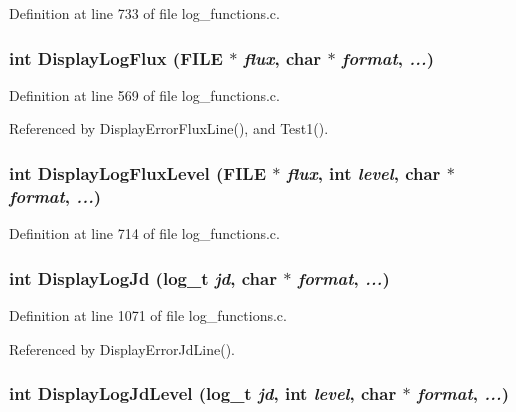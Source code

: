 Definition at line 733 of file log\_\-functions.c.
\subsubsection{\setlength{\rightskip}{0pt plus 5cm}int Display\-Log\-Flux (FILE $\ast$ {\em flux}, char $\ast$ {\em format},  {\em ...})}\label{log__functions_8c_a70}




Definition at line 569 of file log\_\-functions.c.

Referenced by Display\-Error\-Flux\-Line(), and Test1().
\subsubsection{\setlength{\rightskip}{0pt plus 5cm}int Display\-Log\-Flux\-Level (FILE $\ast$ {\em flux}, int {\em level}, char $\ast$ {\em format},  {\em ...})}\label{log__functions_8c_a76}




Definition at line 714 of file log\_\-functions.c.
\subsubsection{\setlength{\rightskip}{0pt plus 5cm}int Display\-Log\-Jd (log\_\-t {\em jd}, char $\ast$ {\em format},  {\em ...})}\label{log__functions_8c_a92}




Definition at line 1071 of file log\_\-functions.c.

Referenced by Display\-Error\-Jd\-Line().
\subsubsection{\setlength{\rightskip}{0pt plus 5cm}int Display\-Log\-Jd\-Level (log\_\-t {\em jd}, int {\em level}, char $\ast$ {\em format},  {\em ...})}\label{log__functions_8c_a91}





